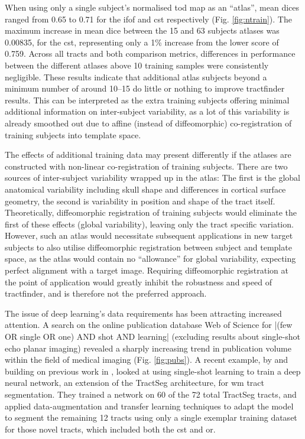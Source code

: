 When using only a single subject's normalised \gls{tod} map as an ``atlas'', mean \glspl{dice} ranged from 0.65 to 0.71 for the \gls{ifof} and \gls{cst} respectively (Fig. \ref{fig:ntrain}).
The maximum increase in mean \gls{dice} between the 15 and 63 subjects atlases was 0.00835, for the \gls{cst}, representing only a 1\% increase from the lower score of 0.759.
Across all tracts and both comparison metrics, differences in performance between the different atlases above 10 training samples were consistently negligible.
These results indicate that additional atlas subjects beyond a minimum number of around 10--15 do little or nothing to improve tractfinder results.
This can be interpreted as the extra training subjects offering minimal additional information on inter-subject variability, as a lot of this variability is already smoothed out due to affine (instead of diffeomorphic) co-registration of training subjects into template space.

The effects of additional training data may present differently if the atlases are constructed with non-linear co-registration of training subjects. %
There are two sources of inter-subject variability wrapped up in the atlas:
The first is the global anatomical variability including skull shape and differences in cortical surface geometry, the second is variability in position and shape of the tract itself.
Theoretically, diffeomorphic registration of training subjects would eliminate the first of these effects (global variability), leaving only the tract specific variation.
However, such an atlas would necessitate subsequent applications in new target subjects to also utilise diffeomorphic registration between subject and template space, as the atlas would contain no ``allowance'' for global variability, expecting perfect alignment with a target image.
Requiring diffeomorphic registration at the point of application would greatly inhibit the robustness and speed of tractfinder, and is therefore not the preferred approach.

The issue of deep learning's data requirements has been attracting increased attention.
A search on the online publication database Web of Science for \spverb|(few OR single OR one) AND shot AND learning|  (excluding results about single-shot echo planar imaging) revealed a sharply increasing trend in publication volume within the field of medical imaging (Fig. \ref{fig:pubs}).
A recent example, by \textcite{Liu2023a} and building on previous work in \textcite{Lu2021}, looked at using single-shot learning to train a deep neural network, an extension of the TractSeg architecture, for \gls{wm} tract segmentation.
They trained a network on 60 of the 72 total TractSeg tracts, and applied data-augmentation and transfer learning techniques to adapt the model to segment the remaining 12 tracts using only a single exemplar training dataset for those novel tracts, which included both the \gls{cst} and \gls{or}.

